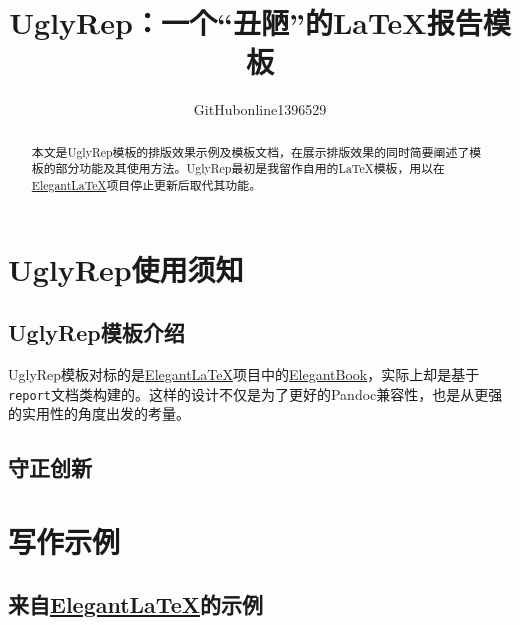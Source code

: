 \documentclass[12pt, textbook]{uglyrep}
\title{\bfseries UglyRep：一个“丑陋”的\LaTeX{}报告模板}
\author{GitHubonline1396529}
\date{\zhdate{2022/12/31}}
\begin{document}
\maketitle
\begin{abstract}
  本文是UglyRep模板的排版效果示例及模板文档，在展示排版效果的同时简要阐述了模板的部分功能及其使用方法。UglyRep最初是我留作自用的\LaTeX 模板，用以在\href{https://github.com/ElegantLaTeX/}{Elegant\LaTeX}项目停止更新后取代其功能。

\end{abstract}

\tableofcontents

\chapter{UglyRep使用须知}

\section{UglyRep模板介绍}



UglyRep模板对标的是\href{https://github.com/ElegantLaTeX/}{Elegant\LaTeX}项目中的\href{https://github.com/ElegantLaTeX/ElegantBook}{ElegantBook}，实际上却是基于\texttt{report}文档类构建的。这样的设计不仅是为了更好的Pandoc兼容性，也是从更强的实用性的角度出发的考量。

\section{守正创新}



\chapter{写作示例}

\section{来自\href{https://github.com/ElegantLaTeX/}{Elegant\LaTeX}的示例}


\end{document}
